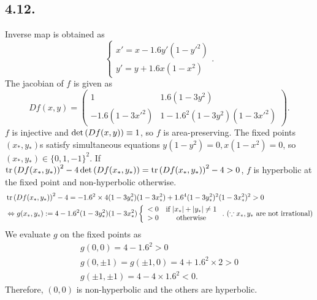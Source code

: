 \documentclass[a4paper,11pt,fleqn]{article}
\begin{document}
\maketitle
\subsection{4.12.}
Inverse map is obtained as
\begin{equation}
    \left\lbrace\begin{array}{c}
        x' = x - 1.6y'(1-y'^2) \\
        y' = y + 1.6x(1-x^2)
    \end{array}\right. .
\end{equation}
The jacobian of $f$ is given as 
\begin{equation}
    Df(x,y) = \left(\begin{array}{cc}
        1 & 1.6(1-3y^2) \\
        -1.6(1-3x'^2) & 1-1.6^2(1-3y^2)(1-3x'^2)
    \end{array} \right). 
\end{equation}
$f$ is injective and $\mathop{\rm det}{(Df(x,y))}\equiv 1$, so $f$ is area-preserving. 
The fixed points $(x_*,y_*)$s satisfy simultaneous equations $y(1-y^2)=0, x(1-x^2)=0$, so $(x_*,y_*) \in \{0,1,-1\}^2$. If $\mathop{\rm tr}{(Df(x_*,y_*))}^2-4 \mathop{\rm det}{(Df(x_*,y_*))} = \mathop{\rm tr}{(Df(x_*,y_*))}^2 - 4 > 0$, $f$ is hyperbolic at the fixed point and non-hyperbolic otherwise. 
\begin{align}
    &\mathop{\rm tr}{(Df(x_*,y_*))}^2 - 4 = -1.6^2\times 4(1-3y_*^2)(1-3x_*^2) + 1.6^4(1-3y_*^2)^2(1-3x_*^2)^2 > 0 \nonumber \\
    &\Leftrightarrow g(x_*,y_*):= 4 -1.6^2(1-3y_*^2)(1-3x_*^2) \left\lbrace \begin{array}{cc}
        <0 & \text{if} \ |x_*|+|y_*|\neq 1 \\
        >0 & \text{otherwise}
    \end{array}\right. . \ (\because x_*, y_* \text{ are not irrational} )
\end{align}
We evaluate $g$ on the fixed points as 
\begin{align}
    g(0,0) = 4 - 1.6^2 >0 \nonumber \\
    g(0,\pm 1) = g(\pm 1,0) = 4+1.6^2\times2 >0 \nonumber \\
    g(\pm 1,\pm 1) = 4-4\times 1.6^2 <0 .
\end{align}
Therefore, $(0,0)$ is non-hyperbolic and the others are hyperbolic. 
\hruleskip
\end{document}
